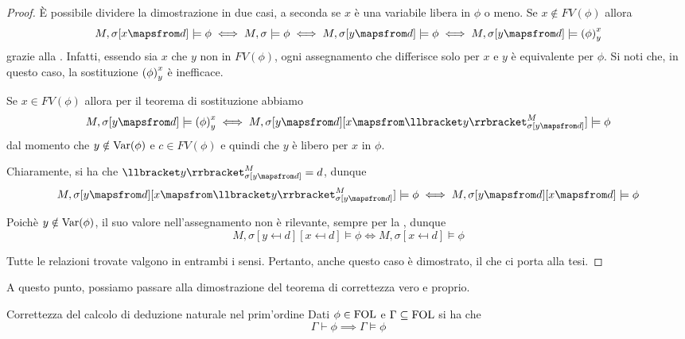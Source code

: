 \begin{proof}
  È possibile dividere la dimostrazione in due casi, a seconda se \(x\) è una variabile libera in \(\phi\) o meno.
  Se \(x \notin FV(\phi)\) allora
  \[M,\sigma[x\mapsfrom d] \models \phi \iff M,\sigma\models \phi \iff M,\sigma[y\mapsfrom d]\models \phi \iff M,\sigma[y\mapsfrom d] \models \subs{\phi}{x}{y}\]
  grazie alla . Infatti, essendo sia \(x\) che \(y\) non in \(FV(\phi)\), ogni assegnamento che differisce solo per \(x\) e \(y\) è equivalente per \(\phi\).
  Si noti che, in questo caso, la sostituzione \({{\left(\phi\right)}^{x}_{y}}\) è inefficace.

  Se \(x \in FV(\phi)\) allora per il teorema di sostituzione abbiamo
  \[M,\sigma[y\mapsfrom d] \models \subs{\phi}{x}{y} \iff M,\sigma[y\mapsfrom d][x\mapsfrom \den{y}[M][\sigma[y\mapsfrom d]]] \models \phi\]
  dal momento che \(y\notin \operatorname{Var}(\phi)\) e \(c \in FV(\phi)\) e quindi che \(y\) è libero per \(x\) in \(\phi\).

  Chiaramente, si ha che \(\den{y}[M][\sigma[y\mapsfrom d]] = d\), dunque
  \[M,\sigma[y\mapsfrom d][x\mapsfrom \den{y}[M][\sigma[y\mapsfrom d]]] \models \phi \iff M,\sigma[y\mapsfrom d][x\mapsfrom d] \models \phi\]

  Poichè \(y\notin \operatorname{Var}(\phi)\), il suo valore nell'assegnamento non è rilevante, sempre per la , dunque
  \[M,\sigma[y\mapsfrom d][x\mapsfrom d] \models \phi \iff M,\sigma[x\mapsfrom d] \models \phi\]

  Tutte le relazioni trovate valgono in entrambi i sensi. Pertanto, anche questo caso è dimostrato, il che ci porta alla tesi.
\end{proof}

A questo punto, possiamo passare alla dimostrazione del teorema di correttezza vero e proprio.

\begin{theorem}{Correttezza del calcolo di deduzione naturale nel prim'ordine}
  Dati \(\phi \in \FOL\) e \(\Gamma \subseteq \FOL\) si ha che
  \[\Gamma \vdash \phi \implies \Gamma \models \phi\]
\end{theorem}

